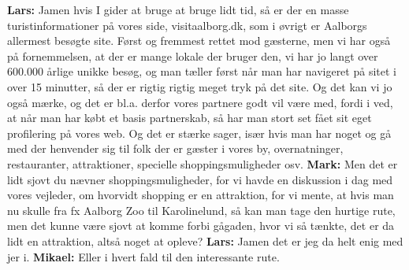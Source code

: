 \textbf{Lars:} Jamen hvis I gider at bruge at bruge lidt tid, så er der en masse turistinformationer på vores side, visitaalborg.dk, som i øvrigt er Aalborgs allermest besøgte site. Først og fremmest rettet mod gæsterne, men vi har også på fornemmelsen, at der er mange lokale der bruger den, vi har jo langt over 600.000 årlige unikke besøg, og man tæller først når man har navigeret på sitet i over 15 minutter, så der er rigtig rigtig meget tryk på det site. Og det kan vi jo også mærke, og det er bl.a. derfor vores partnere godt vil være med, fordi i ved, at når man har købt et basis partnerskab, så har man stort set fået sit eget profilering på vores web. Og det er stærke sager, især hvis man har noget og gå med der henvender sig til folk der er gæster i vores by, overnatninger, restauranter, attraktioner, specielle shoppingsmuligheder osv. \newline
\textbf{Mark:} Men det er lidt sjovt du nævner shoppingsmuligheder, for vi havde en diskussion i dag med vores vejleder, om hvorvidt shopping er en attraktion, for vi mente, at hvis man nu skulle fra fx Aalborg Zoo til Karolinelund, så kan man tage den hurtige rute, men det kunne være sjovt at komme forbi gågaden, hvor vi så tænkte, det er da lidt en attraktion, altså noget at opleve? \newline
\textbf{Lars:} Jamen det er jeg da helt enig med jer i. \newline
\textbf{Mikael:} Eller i hvert fald til den interessante rute.\newline
